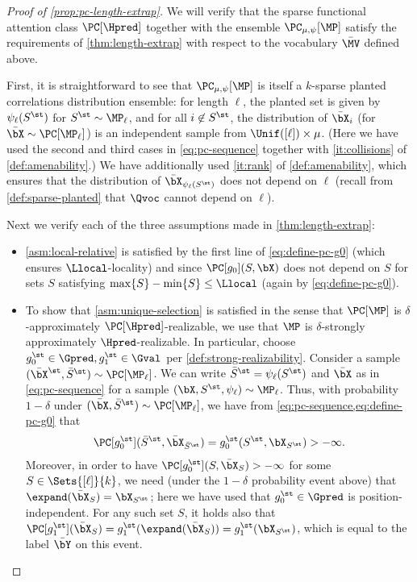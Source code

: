 \documentclass{article}
\begin{document}
\begin{proof}[Proof of \cref{prop:pc-length-extrap}]
  We will verify that the sparse functional attention class $\PC[\Hpred]$ together with the ensemble $\PC_{\mu, \psi}[\MP]$ satisfy the requirements of \cref{thm:length-extrap} with respect to the vocabulary $\bar \MV$ defined above.

  First, it is straightforward to see that $\PC_{\mu, \psi}[\MP]$ is itself a $k$-sparse planted correlations distribution ensemble: for length $\ell$, the planted set is given by $\psi_\ell(S^\st)$ for $S^\st \sim \MP_\ell$, and for all $i \not \in S^\st$, the distribution of $\bar \bX_i$ (for $\bar\bX \sim \PC[\MP_\ell]$) is an independent sample from $\Unif([\ell]) \times \mu$. (Here we have used the second and third cases in \cref{eq:pc-sequence} together with \cref{it:collisions} of \cref{def:amenability}.) We have additionally used \cref{it:rank} of \cref{def:amenability}, which ensures that the distribution of $\bar\bX_{\psi_\ell(S^\st)}$ does not depend on $\ell$ (recall from \cref{def:sparse-planted} that $\Qvoc$ cannot depend on $\ell$). 

  
  Next we verify each of the three assumptions made in \cref{thm:length-extrap}:
  \begin{itemize}
  \item \cref{asm:local-relative} is satisfied by the first line of \cref{eq:define-pc-g0} (which ensures $\Llocal$-locality) and since $\PC[g_0](S, \bX)$ does not depend on $S$ for sets $S$ satisfying $\max\{S\} - \min\{S \} \leq \Llocal$ (again by \cref{eq:define-pc-g0}). 
  \item To show that \cref{asm:unique-selection} is satisfied in the sense that
    $\PC[\MP]$ is $\delta$-approximately $\PC[\Hpred]$-realizable, we use that $\MP$ is $\delta$-strongly approximately $\Hpred$-realizable. In particular, choose $g_0^\st \in \Gpred, g_1^\st \in \Gval$ per \cref{def:strong-realizability}. %
    Consider a sample $(\bar \bX^\st, \bar S^\st) \sim \PC[\MP_\ell]$. We can write $\bar S^\st = \psi_\ell(S^\st)$ and $\bar \bX$ as in \cref{eq:pc-sequence} for a sample $(\bX, S^\st, \psi_\ell) \sim \MP_\ell$. 
    Thus, with probability $1-\delta$ under $(\bar \bX, \bar S^\st) \sim \PC[\MP_\ell]$, we have from \cref{eq:pc-sequence,eq:define-pc-g0} that
    \begin{align}
\PC[g_0^\st](\bar S^\st, \bar \bX_{\bar S^\st})  = g_0^\st(S^\st, \bX_{S^\st}) > -\infty\nonumber.
    \end{align}
    Moreover, in order to have $\PC[g_0^\st](S, \bar \bX_S)> -\infty$ for some $S \in \Sets{[\ell]}{k}$, we need (under the $1-\delta$ probability event above) that $\expand(\bar\bX_{S}) =\bX_{S^\st}$; here we have used that $g_0^\st \in \Gpred$ is position-independent. %
    For any such set $S$, it holds also that $\PC[g_1^\st](\bar\bX_{S}) = g_1^\st(\expand(\bar \bX_S)) = g_1^\st(\bX_{S^\st})$, which is equal to the label $\bar \bY$ on this event. %
    

\end{itemize}
\end{proof}
\end{document}
